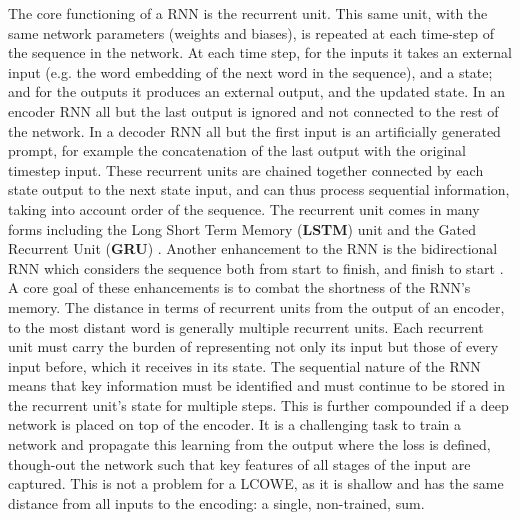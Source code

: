 \documentclass{book}
\begin{document}
The core functioning of a RNN is the recurrent unit.
This  same unit, with the same network parameters (weights and biases),
is repeated at each time-step of the sequence in the network.
At each time step, for the inputs it takes an external input (e.g. the word embedding of the next word in the sequence), and a state;
and for the outputs it produces an external output, and the updated state.
In an encoder RNN all but the last output is ignored and not connected to the rest of the network.
In a decoder RNN all but the first input is an artificially generated prompt, for example the concatenation of the last output with the original timestep input.
These recurrent units are chained together connected by each state output to the next state input,
and can thus process sequential information, taking into account order of the sequence.
The recurrent unit comes in many forms including the 
Long Short Term Memory (\textbf{LSTM}) unit \citep{hochreiter1997long,gers1999learning}
and the Gated Recurrent Unit (\textbf{GRU})  \citep{chung2014empirical,cho2014properties}.
Another enhancement to the RNN is the bidirectional RNN
which considers the sequence both from start to finish, and finish to start \citep{schuster1997bidirectional}.
A core goal of these enhancements is to combat the shortness of the RNN's memory.
The distance in terms of recurrent units from the output of an encoder, to the most distant word is generally multiple recurrent units.
Each recurrent unit must carry the burden of representing not only its input but those of every input before, which it receives in its state.
The sequential nature of the RNN means that key information must be identified and must continue to be stored in the recurrent unit's state for multiple steps.
This is further compounded if a deep network is placed on top of the encoder.
It is a challenging task to train a network and propagate this learning from the output where the loss is defined, though-out the network such that key features of all stages of the input are captured.
This is not a problem for a LCOWE, as it is shallow and has the same distance from all inputs to the encoding: a single, non-trained, sum.
\end{document}
